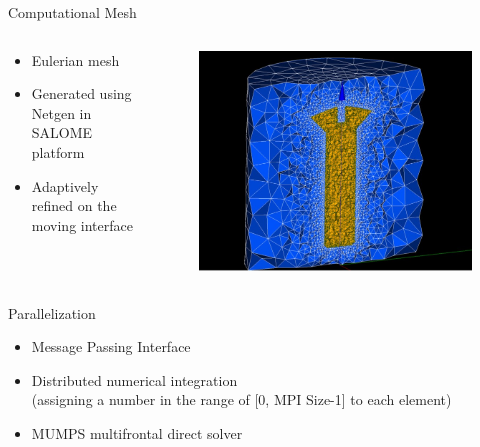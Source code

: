 \documentclass[11pt,t]{beamer}
\begin{document}
\begin{frame}[fragile]{Computational Mesh}

	\begin{columns}[t]
		\begin{column}{.45\textwidth}
		\begin{itemize}
	\item	
Eulerian mesh
\item
Generated using Netgen in SALOME platform
\item
Adaptively refined on the moving interface 
		\end{itemize}
		
		\end{column}
		\begin{column}{.55\textwidth}
			\vspace{-0.8cm}
			\begin{figure}
			\centering
			\includegraphics[width=\textwidth]{mesh_screw}

			\end{figure}
		\end{column}
	\end{columns}

\end{frame}


\begin{frame}[fragile]{Parallelization}

\begin{itemize}
\item
Message Passing Interface
\item
Distributed numerical integration\\
(assigning a number in the range of [0, MPI Size-1] to each element)
\item
MUMPS multifrontal direct solver
\end{itemize}

\end{frame}
\end{document}
